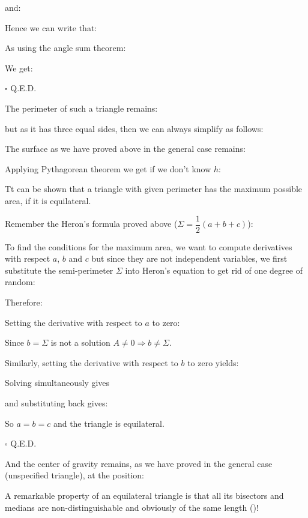 {\begin{dem}
	and:
	
	Hence we can write that:
	
	As using the angle sum theorem:
	
	We get:
	
	\begin{flushright}
		$\square$  Q.E.D.
	\end{flushright}
	\end{dem} 
	The perimeter of such a triangle remains:
	
	but as it has three equal sides, then we can always simplify as follows:
	
	The surface as we have proved above in the general case remains:
	
	Applying Pythagorean theorem we get if we don't know $h$:
	
	Tt can be shown that a triangle with given perimeter has the maximum possible area, if it is equilateral.
	\begin{dem}
	Remember the Heron's formula proved above ($\Sigma=\dfrac{1}{2}(a+b+c)$):
	
	To find the conditions for the maximum area, we want to compute derivatives with respect $a$, $b$ and $c$ but since they are not independent variables, we first substitute the semi-perimeter $\Sigma$ into Heron's equation to get rid of one degree of random:
	
	Therefore:
	
	Setting the derivative with respect to $a$ to zero:
	
	Since $b=\Sigma$ is not a solution $A\neq 0\Rightarrow b\neq \Sigma$.
	
	Similarly, setting the derivative with respect to $b$ to zero yields:
	
	Solving simultaneously gives
	
	and substituting back gives:
	
	So $a=b=c$ and the triangle is equilateral.
	\begin{flushright}
		$\square$  Q.E.D.
	\end{flushright}
	\end{dem}
	And the center of gravity remains, as we have proved in the general case (unspecified triangle), at the position:
	
	A remarkable property of an equilateral triangle is that all its bisectors and medians are non-distinguishable and obviously of the same length ()!
	
}
